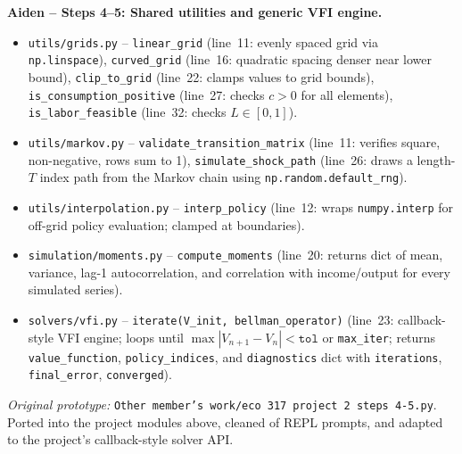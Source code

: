 \documentclass[11pt]{article}
\begin{document}
\begin{intuitbox}
\textbf{Aiden -- Steps 4--5: Shared utilities and generic VFI engine.}
\begin{itemize}
    \item \texttt{utils/grids.py} -- \texttt{linear\_grid} (line~11: evenly spaced grid via \texttt{np.linspace}), \texttt{curved\_grid} (line~16: quadratic spacing denser near lower bound), \texttt{clip\_to\_grid} (line~22: clamps values to grid bounds), \texttt{is\_consumption\_positive} (line~27: checks $c>0$ for all elements), \texttt{is\_labor\_feasible} (line~32: checks $L\in[0,1]$).
    \item \texttt{utils/markov.py} -- \texttt{validate\_transition\_matrix} (line~11: verifies square, non-negative, rows sum to 1), \texttt{simulate\_shock\_path} (line~26: draws a length-$T$ index path from the Markov chain using \texttt{np.random.default\_rng}).
    \item \texttt{utils/interpolation.py} -- \texttt{interp\_policy} (line~12: wraps \texttt{numpy.interp} for off-grid policy evaluation; clamped at boundaries).
    \item \texttt{simulation/moments.py} -- \texttt{compute\_moments} (line~20: returns dict of mean, variance, lag-1 autocorrelation, and correlation with income/output for every simulated series).
    \item \texttt{solvers/vfi.py} -- \texttt{iterate(V\_init, bellman\_operator)} (line~23: callback-style VFI engine; loops until $\max|V_{n+1}-V_n|<\texttt{tol}$ or \texttt{max\_iter}; returns \texttt{value\_function}, \texttt{policy\_indices}, and \texttt{diagnostics} dict with \texttt{iterations}, \texttt{final\_error}, \texttt{converged}).
\end{itemize}
\textit{Original prototype:} \texttt{Other member's work/eco 317 project 2 steps 4-5.py}.
Ported into the project modules above, cleaned of REPL prompts, and adapted to the project's callback-style solver API.


\end{intuitbox}
\end{document}
